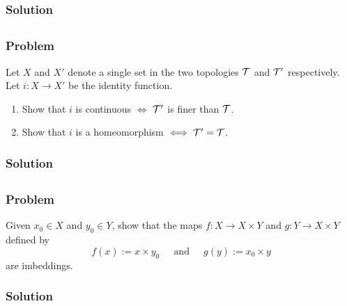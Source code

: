 \subsubsection{Solution}
\todo


\subsection{}

\subsubsection{Problem}
Let $X$ and $X'$ denote a single set in the two topologies $\mathcal T$ and $\mathcal T'$ respectively. Let $i : X \to X'$ be the identity function. 
\begin{enumerate}
    \item Show that $i$ is continuous $\iff$ $\mathcal T'$ is finer than $\mathcal T$.
    \item Show that $i$ is a homeomorphism $\iff \mathcal T' = \mathcal T$.
\end{enumerate}

\subsubsection{Solution}
\todo


\subsection{}

\subsubsection{Problem}
Given $x_0 \in X$ and $y_0 \in Y$, show that the maps $f : X \to X \times Y$ and $g : Y \to X \times Y$ defined by
\[ f(x) := x \times y_0 ~~~~~\mbox{ and }~~~~~ g(y) := x_0 \times y \]
are imbeddings.

\subsubsection{Solution}
\todo


\subsection{}


